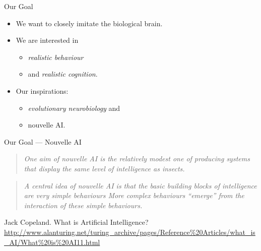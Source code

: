 \documentclass{beamer}
\begin{document}
   \begin{frame}{Our Goal}
      
      \begin{itemize}
         \item We want to closely imitate the biological brain.
         
         \pause
         
         \item We are interested in
         \begin{itemize}
            \item \emph{realistic behaviour}
            \item and \emph{realistic cognition}.
         \end{itemize}
         
         \pause
         
         \item Our inspirations:
         \begin{itemize}
            \item \emph{evolutionary neurobiology} and
            \item nouvelle AI.
         \end{itemize}
      \end{itemize}
   \end{frame}
   
   \begin{frame}{Our Goal --- Nouvelle AI}
      
         \pause
      
         \begin{quote}\emph{
            One aim of nouvelle AI is the relatively modest one of producing systems that display the same level of intelligence as insects.
         }\end{quote}
         
         \pause
            
        \begin{quote}\emph{
           A central idea of nouvelle AI is that the basic building blocks of intelligence are very simple behaviours {\upshape[$\dots$]} More complex behaviours ``emerge'' from the interaction of these simple behaviours.
         }\end{quote}
         
         \pause
         
         Jack Copeland. What is Artificial Intelligence?\\
         {\footnotesize\url{http://www.alanturing.net/turing_archive/pages/Reference\%20Articles/what\_is\_AI/What\%20is\%20AI11.html}}
   \end{frame}
   
\end{document}

